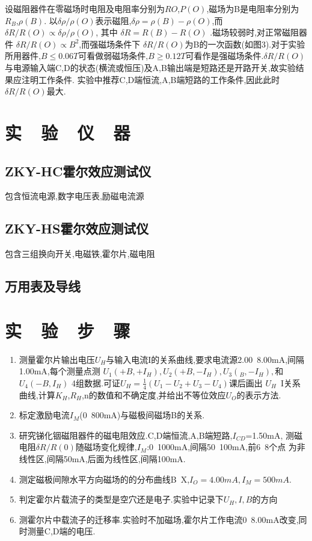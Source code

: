 \documentclass{thuemp}
\begin{document}
设磁阻器件在零磁场时电阻及电阻率分别为$R{O}$,$P(O)$,磁场为B是电阻率分别为$R_{B}$,$\rho(B)$.
以$ \delta \rho/\rho(O) $表示磁阻,$ \delta \rho = \rho (B) - \rho(O) $,而$\delta R /R(O) \propto \delta \rho /\rho(O)$,
其中
$ \delta R = R(B)-R(O) $
.磁场较弱时,对正常磁阻器件
$\delta R /R(O)\propto B^{2}$,而强磁场条件下
$ \delta R /R(O)$为B的一次函数(如图3).对于实验所用器件,$ B \leq 0.06T$可看做弱磁场条件,$B\geq 0.12T$可看作是强磁场条件.$\delta R / R(O)$与电源输入端C,D的状态(横流或恒压)及A,B输出端是短路还是开路开关,故实验结果应注明工作条件.
实验中推荐C,D端恒流,A,B端短路的工作条件,因此此时$\delta R/R(O)$最大.
\section{实~~验~~仪~~器}
\subsection{ZKY-HC霍尔效应测试仪}
包含恒流电源,数字电压表,励磁电流源
\subsection{ZKY-HS霍尔效应测试仪}
包含三组换向开关,电磁铁,霍尔片,磁电阻
\subsection{万用表及导线}
\section{实~~验~~步~~骤} 
\begin{enumerate}
	\item 测量霍尔片输出电压$U_{H}$与输入电流I的关系曲线,要求电流源2.00~8.00mA,间隔1.00mA,每个测量点测
	$ U_{1}(+B,+I_H{}),U_{2}(+B,-I_{H}),U_{3}(_B,-I_{H}), $和$U_{4}(-B,I_{H})$
	4组数据.可证$U_{H}=\frac{1}{4}(U_{1}-U_{2}+U_{3}-U_{4})$课后画出
	$U_{H}$~I关系曲线,计算$K_{H}$,$R_{H}$,n的数值和不确定度,并给出不等位效应$U_{O}$的表示方法.
	\item 标定激励电流$I_{M}$(0~800mA)与磁极间磁场B的关系.
	\item 研究锑化铟磁阻器件的磁电阻效应.C,D端恒流,A,B端短路,$ I_{CD} $=1.50mA,
	测磁电阻$ \delta R/R(0) $随磁场变化规律,$ I_{M} $:0~1000mA,间隔50~100mA,前6~8个点
	为非线性区,间隔50mA,后面为线性区,间隔100mA.
	\item 测定磁极间隙水平方向磁场的的分布曲线B~X,$ I_{O}=4.00mA,I_{M}=500mA $.
	\item 判定霍尔片载流子的类型是空穴还是电子.实验中记录下$ U_{H},I,B $的方向
	\item 测霍尔片中载流子的迁移率.实验时不加磁场,霍尔片工作电流0~8.00mA改变,同时测量C,D端的电压.
\end{enumerate}
\end{document}
